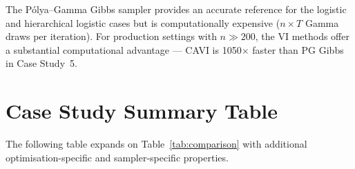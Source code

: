 \documentclass[11pt,a4paper]{article}
\begin{document}
The P\'{o}lya--Gamma Gibbs sampler provides an accurate reference for the logistic
and hierarchical logistic cases but is computationally expensive ($n \times T$
Gamma draws per iteration).
For production settings with $n \gg 200$, the VI methods offer a substantial
computational advantage --- CAVI is 1050$\times$ faster than PG Gibbs in Case Study~5.

\printbibliography

\appendix

\section{Case Study Summary Table}
\label{app:comparison-table}

The following table expands on Table~\ref{tab:comparison} with additional
optimisation-specific and sampler-specific properties.
\end{document}
